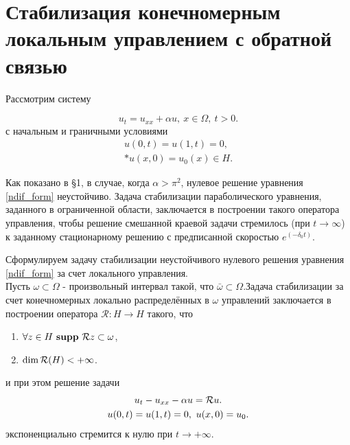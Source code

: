 \section{Стабилизация конечномерным локальным управлением с обратной связью}

Рассмотрим систему

\begin{equation}\label{ndif_form}
    u_t = u_{xx} + \alpha u, \ x \in \Omega, \ t > 0.
\end{equation}
с начальным и граничными условиями
\begin{gather}
    u(0, t) = u(1, t) = 0, \\*
    u(x, 0) = u_{0}(x) \in H .\nonumber
\end{gather}

Как показано в \S 1, в случае, когда $\alpha > \pi^2$, нулевое решение уравнения 
\eqref{ndif_form} неустойчиво.
Задача стабилизации параболического уравнения, заданного в ограниченной области,
заключается в построении такого оператора управления, чтобы решение смешанной 
краевой задачи стремилось (при $t \rightarrow \infty$) к заданному стационарному 
решению с предписанной скоростью $e^{(-\delta_0t)}$.

Сформулируем задачу стабилизации неустойчивого нулевого решения уравнения 
\eqref{ndif_form} за счет локального управления.\\

Пусть $\omega \subset \Omega$ - произвольный интервал такой, что 
$\bar{\omega} \subset \Omega$.Задача стабилизации за счет конечномерных локально 
распределённых в $\omega$ управлений заключается в построении оператора 
$\mathcal{R} : H \rightarrow H$ такого, что

\begin{enumerate}
    \item $\forall z \in H \ \mathbf{supp} \ \operator{z} \subset \omega$,
    \item $\dim \mathcal{R}{(H)} < +\infty$.
\end{enumerate}
и при этом решение задачи
\begin{gather}
    u_t - u_{xx} - \alpha u = \mathcal{R}{u}. \nonumber\\
    u(0, t) = u(1, t) = 0, \ u(x, 0) = u_0. \nonumber
\end{gather}
экспоненциально стремится к нулю при $t \rightarrow + \infty$.

